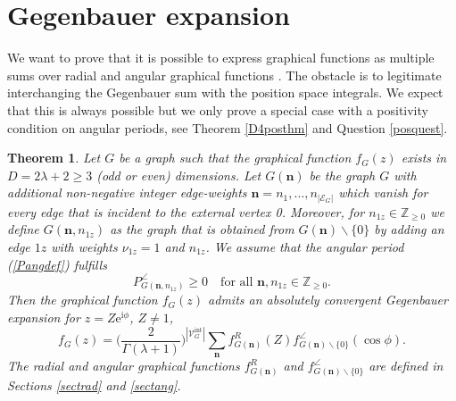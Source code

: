 \documentclass[oneside]{amsart}
\newcommand{\ZZ}{{\mathbb Z}}
\newcommand{\ee}{\mathrm{e}}
\newcommand{\ii}{\mathrm{i}}
\newcommand{\sE}{\mathcal{E}}
\newcommand{\sV}{\mathcal{V}}
\newcommand{\sVGint}{{\sV_G^\mathrm{int}}}
\newcommand{\VGint}{{|\sVGint|}}
\theoremstyle{plain}
\newtheorem{thm}{Theorem}
\begin{document}
\section{Gegenbauer expansion}\label{sectgegexp}
We want to prove that it is possible to express graphical functions as multiple sums over radial and angular graphical functions \cite{geg}.
The obstacle is to legitimate interchanging the Gegenbauer sum with the position space integrals. We expect that this is always possible but
we only prove a special case with a positivity condition on angular periods, see Theorem \ref{D4posthm} and Question \ref{posquest}.

\begin{thm}\label{thmgegex0}
Let $G$ be a graph such that the graphical function $f_G(z)$ exists in $D=2\lambda+2\geq3$ (odd or even) dimensions.
Let $G(\mathbf n)$ be the graph $G$ with additional non-negative integer edge-weights $\mathbf n=n_1,\ldots,n_{|\sE_G|}$
which vanish for every edge that is incident to the external vertex 0. Moreover, for $n_{1z}\in\ZZ_{\geq0}$ we define $G(\mathbf n,n_{1z})$ as the graph that is obtained
from $G(\mathbf n)\backslash\{0\}$ by adding an edge $1z$ with weights $\nu_{1z}=1$ and $n_{1z}$. We assume that the angular period (\ref{Pangdef}) fulfills
\begin{equation}\label{gegthmcond}
P_{G(\mathbf n,n_{1z})}^\angle\geq0\quad\text{for all }\mathbf n,n_{1z}\in\ZZ_{\geq0}.
\end{equation}
Then the graphical function $f_G(z)$ admits an absolutely convergent Gegenbauer expansion for $z=Z\ee^{\ii\phi}$, $Z\neq1$,
\begin{equation}\label{gfr}
f_G(z)=\Big(\frac{2}{\Gamma(\lambda+1)}\Big)^\VGint\sum_{\mathbf n}f_{G(\mathbf n)}^R(Z)f_{G(\mathbf n)\backslash\{0\}}^\angle(\cos\phi).
\end{equation}
The radial and angular graphical functions $f_{G(\mathbf n)}^R$ and $f_{G(\mathbf n)\backslash\{0\}}^\angle$ are defined in Sections \ref{sectrad} and \ref{sectang}.
\end{thm}
\end{document}
